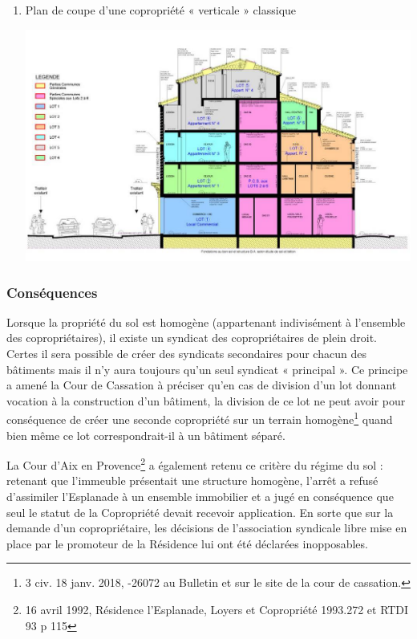 \begin{enumerate}
				
				\item Plan de coupe d’une copropriété « verticale » classique
				\begin{center}
					\includegraphics[width=0.7\linewidth]{images/planCoupeCopro}
				\end{center}
				
			\end{enumerate}

		\subsubsection{Conséquences}
			Lorsque la propriété du sol est homogène (appartenant indivisément à l’ensemble des copropriétaires), il
			existe un syndicat des copropriétaires de plein droit. Certes il sera possible de créer des syndicats
			secondaires pour chacun des bâtiments mais il n’y aura toujours qu’un seul syndicat « principal ».
			Ce principe a amené la Cour de Cassation à préciser qu’en cas de division d’un lot donnant vocation à la
			construction d’un bâtiment, la division de ce lot ne peut avoir pour conséquence de créer une seconde
			copropriété sur un terrain homogène\footnote{
			3\degre{} civ. 18 janv. 2018, -26072 au Bulletin et sur le site de la cour de cassation.
			} quand bien même ce lot correspondrait-il à un bâtiment séparé.
			
			La Cour d'Aix en Provence\footnote{
			16 avril 1992, Résidence l'Esplanade, Loyers et Copropriété 1993.272 et RTDI 93 p 115
			} a également retenu ce critère du régime du sol : retenant que l'immeuble
			présentait une structure homogène, l’arrêt a refusé d'assimiler l'Esplanade à un ensemble immobilier et
			a jugé en conséquence que seul le statut de la Copropriété devait recevoir application. En sorte que sur la
			demande d'un copropriétaire, les décisions de l'association syndicale libre mise en place par le promoteur
			de la Résidence lui ont été déclarées inopposables.
			
